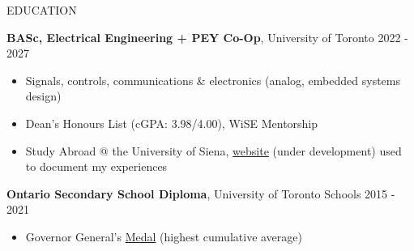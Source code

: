 \documentclass{resume}
\begin{document}

\begin{rSection}{EDUCATION}

   {\bf BASc, Electrical Engineering + PEY Co-Op}, University of Toronto \hfill {2022 - 2027}
   \vspace{-0.2cm}
   \begin{itemize}
    \itemsep -8pt {} 
     \item Signals, controls, communications \& electronics (analog, embedded systems design) 
     \item Dean's Honours List (cGPA: 3.98/4.00), WiSE Mentorship
     \item Study Abroad @ the University of Siena, \href{https://github.com/endothermiic/serendipity}{website} (under development) used to document my experiences 
   \end{itemize}


   {\bf Ontario Secondary School Diploma}, University of Toronto Schools \hfill {2015 - 2021}
   \vspace{-0.2cm}
   \begin{itemize}
    \itemsep -8pt {} 
     \item  Governor General’s \href{https://www.gg.ca/en/honours/recipients/116-110249}{Medal} (highest cumulative average)
   \end{itemize}

\end{rSection}
\end{document}
